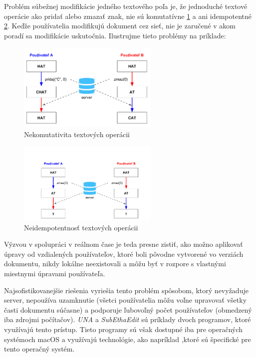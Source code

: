 Problém súbežnej modifikácie jedného textového poľa je, že jednoduché textové operácie ako
pridať alebo zmazať znak, nie sú komutatívne \ref{obr:nekomutativita} a ani 
idempotentné \ref{obr:neidempotentnost}. Keďže používatelia
modifikujú dokument cez sieť, nie je zaručené v akom poradí sa modifikácie uskutočnia. 
\cite {medium_crdt}
Ilustrujme tieto problémy na príklade:

\begin{figure}[h]
\centerline{\includegraphics[width=0.6\textwidth]{images/nekomutativne_operacie}}
\caption[Nekomutativita textových operácii]{Nekomutativita textových operácii}
\label{obr:nekomutativita}
\end{figure}

\begin{figure}[h]
\centerline{\includegraphics[width=0.6\textwidth]{images/neidempotentne_operacie}}
\caption[Neidempotentnosť textových operácii]{Neidempotentnosť textových operácii}
\label{obr:neidempotentnost}
\end{figure}

Výzvou v spolupráci v reálnom čase je teda presne zistiť, ako možno aplikovať úpravy
od vzdialených používateľov, ktoré boli pôvodne vytvorené vo verziách dokumentu,
nikdy lokálne neexistovali a môžu byť v rozpore s vlastnými miestnymi úpravami používateľa.

Najsofistikovanejšie riešenia vyriešia tento problém spôsobom, ktorý nevyžaduje server,
nepoužíva uzamknutie (všetci používatelia môžu voľne upravovať všetky časti dokumentu súčasne) 
a podporuje ľubovoľný počet používateľov (obmedzený iba zdrojmi počítačov). 
\textit{UNA} a \textit{SubEthaEdit} sú príklady dvoch programov, ktoré využívajú tento prístup.
Tieto programy sú však dostupné iba pre operačných systémoch macOS a využívajú technológie,
ako napríklad \cite{bonjour},ktoré sú špecifické pre tento operačný systém.

